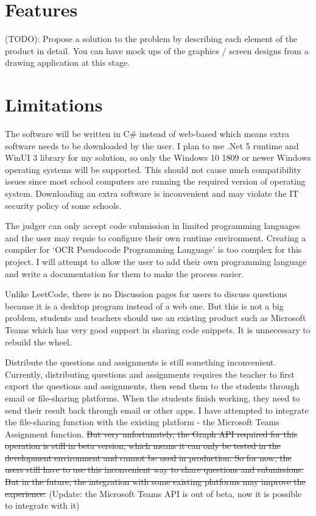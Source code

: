 \documentclass[a4paper]{report}
\begin{document}
\section{Features}

 (TODO): Propose a solution to the problem by describing each element of the product in detail.  You can have mock ups of the graphics / screen designs from a drawing application at this stage.

\section{Limitations}

The software will be written in C\# instead of web-based which means extra software needs to be downloaded by the user. I plan to use .Net 5 runtime and WinUI 3 library for my solution, so only the Windows 10 1809 or newer Windows operating systems will be supported. This should not cause much compatibility issues since most school computers are running the required version of operating system. Downloading an extra software is inconvenient and may violate the IT security policy of some schools.

The judger can only accept code submission in limited programming languages and the user may requie to configure their own runtime environment. Creating a compiler for `OCR Pseudocode Programming Language' is too complex for this project. I will attempt to allow the user to add their own programming language and write a documentation for them to make the process easier. 

Unlike LeetCode, there is no Discussion pages for users to discuss questions because it is a desktop program instead of a web one. But this is not a big problem, students and teachers should use an existing product such as Microsoft Teams which has very good support in sharing code snippets. It is unnecessary to rebuild the wheel.

Distribute the questions and assignments is still something inconvenient. Currently, distributing questions and assignments requires the teacher to first export the questions and assignments, then send them to the students through email or file-sharing platforms. When the students finish working, they need to send their result back through email or other apps. I have attempted to integrate the file-sharing function with the existing platform - the Microsoft Teams Assignment function. \sout{But very unfortunately, the Graph API required for this operation is still in beta version, which means it can only be tested in the development environment and cannot be used in production. So for now, the users still have to use this inconvenient way to share questions and submissions. But in the future, the integration with some existing platforms may improve the experience.} (Update: the Microsoft Teams API is out of beta, now it is possible to integrate with it)
\end{document}
